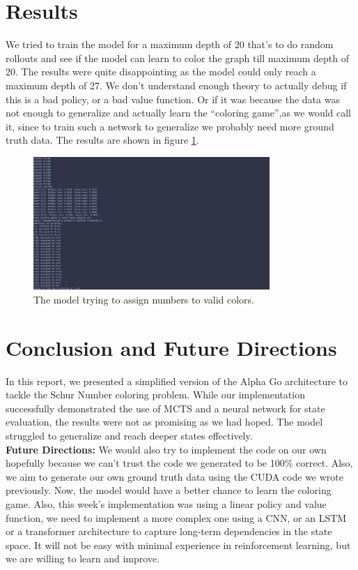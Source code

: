 \documentclass[12pt]{article}
\begin{document}
\section{Results}

We tried to train the model for a maximum depth of 20 that's to do random rollouts and see if the model can learn to color the graph till maximum depth of 20. The results were quite disappointing as
the model could only reach a maximum depth of 27. We don't understand enough theory to actually debug if this is a bad policy, or a bad value function. Or if it was because the data was not enough to generalize and actually learn the ``coloring game'',as we would call it, since to train such a network to generalize we probably need more ground truth data. 
The results are shown in figure \ref{fig:results}.

\begin{figure}[h]
    \centering
    \includegraphics[width=0.8\textwidth]{Images/inference_results.png}
    \caption{The model trying to assign numbers to valid colors.}
    \label{fig:results}
\end{figure}
\section{Conclusion and Future Directions}
In this report, we presented a simplified version of the Alpha Go architecture to tackle the Schur Number coloring problem. While our implementation successfully demonstrated the use of MCTS and a neural network for state evaluation, the results were not as promising as we had hoped. The model struggled to generalize and reach deeper states effectively.  \\
\textbf{Future Directions:}
We would also try to implement the code on our own hopefully because we can't trust the code we generated to be 100\% correct. Also, we aim to generate our own ground truth data using the CUDA code we wrote previously. Now, the model would have a better chance to learn the coloring game. Also, this week's implementation was using a linear policy and value function, we need to implement a more complex one using a CNN, or an LSTM or a transformer architecture to capture long-term dependencies in the state space. It will not be easy with minimal experience in reinforcement learning, but we are willing to learn and improve. 
\end{document}

